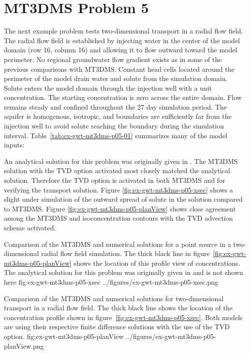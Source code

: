 \section{MT3DMS Problem 5}

The next example problem tests two-dimensional transport in a radial flow field.  The radial flow field is established by injecting water in the center of the model domain (row 16, column 16) and allowing it to flow outward toward the model perimeter. No regional groundwater flow gradient exists as in some of the previous comparisons with MT3DMS. Constant head cells located around the perimeter of the model drain water and solute from the simulation domain. Solute enters the model domain through the injection well with a unit concentration.  The starting concentration is zero across the entire domain. Flow remains steady and confined throughout the 27 day simulation period. The aquifer is homogenous, isotropic, and boundaries are sufficiently far from the injection well to avoid solute reaching the boundary during the simulation interval. Table~\ref{tab:ex-gwt-mt3dms-p05-01} summarizes many of the model inputs:



An analytical solution for this problem was originally given in \cite{moench1981}. The MT3DMS solution with the TVD option activated most closely matched the analytical solution.  Therefore the TVD option is activated in both MT3DMS and \mf for verifying the transport solution. Figure \ref{fig:ex-gwt-mt3dms-p05-xsec} shows a slight under simulation of the outward spread of solute in the \mf solution compared to MT3DMS. Figure \ref{fig:ex-gwt-mt3dms-p05-planView} shows close agreement among the MT3DMS and \mf isoconcentration contours with the TVD advection scheme activated. 

\begin{StandardFigure}
	{Comparison of the MT3DMS and \mf numerical solutions for a point source in a two-dimensional radial flow field simulation.  The thick black line in figure~\ref{fig:ex-gwt-mt3dms-p05-planView} shows the location of this profile view of concentrations.  The analytical solution for this problem was originally given in \citep{moench1981} and is not shown here} 
	{fig:ex-gwt-mt3dms-p05-xsec}
	{../figures/ex-gwt-mt3dms-p05-xsec.png}
\end{StandardFigure}

\begin{StandardFigure}
	{Comparison of the MT3DMS and \mf numerical solutions for two-dimensional transport in a radial flow field.  The thick black line shows the location of the concentration profile shown in figure~\ref{fig:ex-gwt-mt3dms-p05-xsec}. Both models are using their respective finite difference solutions with the use of the TVD option.} 
	{fig:ex-gwt-mt3dms-p05-planView}
	{../figures/ex-gwt-mt3dms-p05-planView.png}
\end{StandardFigure}
